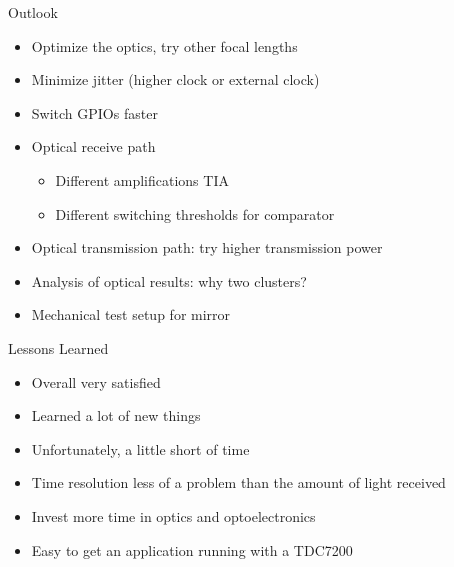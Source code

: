 \begin{frame}{Outlook}
    \begin{itemize}
        \item Optimize the optics, try other focal lengths
        \item Minimize jitter (higher clock or external clock)
        \item Switch GPIOs faster
        \item Optical receive path
              \begin{itemize}
                  \item Different amplifications TIA
                  \item Different switching thresholds for comparator
              \end{itemize}
        \item Optical transmission path: try higher transmission power
        \item Analysis of optical results: why two clusters?
        \item Mechanical test setup for mirror
    \end{itemize}
\end{frame}

\begin{frame}{Lessons Learned}
    \begin{itemize}
        \item Overall very satisfied
        \item Learned a lot of new things
        \item Unfortunately, a little short of time
        \item Time resolution less of a problem than the amount of light received
        \item[$\Rightarrow$] Invest more time in optics and optoelectronics
        \item[$\Rightarrow$] Easy to get an application running with a TDC7200
    \end{itemize}
\end{frame}
